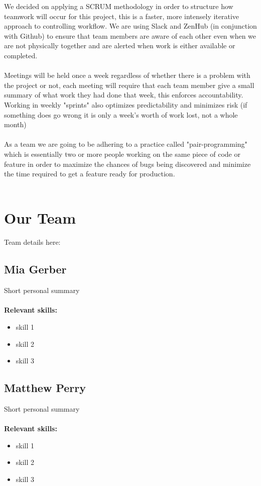 \documentclass[12pt,a4paper]{article}
\begin{document}
\textnormal We decided on applying a SCRUM methodology in order to structure how teamwork will occur for
			this project, this is a faster, more intensely iterative approach to controlling workflow.
			We are using Slack and ZenHub (in conjunction with Github) to ensure that team members are aware of each other even when we are not physically together and are alerted when work is either available or completed.
			\\ \\
			Meetings will be held once a week regardless of whether there is a problem with
			the project or not, each meeting will require that each team member give a small summary
			of what work they had done that week, this enforces accountability. Working in weekly "sprints" also optimizes predictability and minimizes risk (if something does go wrong it is only a week's worth of work lost, not a whole month)
			\\ \\
			As a team we are going to be adhering to a practice called "pair-programming" which is essentially two or more people working on the same piece of code or feature in order to maximize the chances of bugs being discovered and minimize the time required to get a feature ready for production. 
			\\ \\ 

	\newpage
	\section{Our Team}
   	Team details here:
		\subsection{Mia Gerber}
		Short personal summary\\\\
		\textbf{\small Relevant skills:}
		\begin{itemize}
			\item skill 1
			\item skill 2
			\item skill 3
		\end{itemize}
		
		
		\subsection{Matthew Perry}
		Short personal summary\\\\
		\textbf{\small Relevant skills:}
		\begin{itemize}
			\item skill 1
			\item skill 2
			\item skill 3
		\end{itemize}
		
\end{document}

